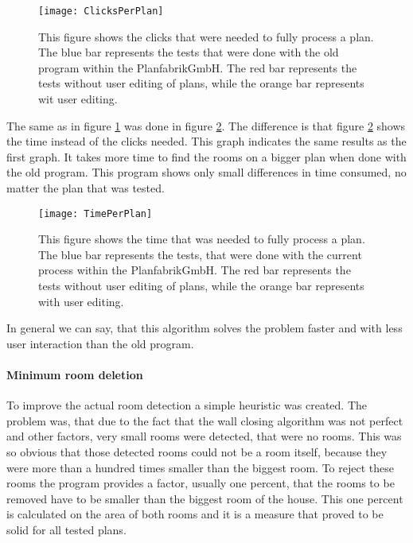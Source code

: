 \begin{figure}[H]
	\centering
	\texttt{[image: ClicksPerPlan]}
	\caption{This figure shows the clicks that were needed to fully process a plan. The blue bar represents the tests that were done with the old program within the PlanfabrikGmbH. The red bar represents the tests without user editing of plans, while the orange bar represents wit user editing.}
	\label{fig:ClicksPerPlan}
\end{figure}

The same as in figure \ref{fig:ClicksPerPlan} was done in figure \ref{fig:TimePerPlan}. The difference is that figure \ref{fig:TimePerPlan} shows the time instead of the clicks needed. This graph indicates the same results as the first graph. It takes more time to find the rooms on a bigger plan when done with the old program. This program shows only small differences in time consumed, no matter the plan that was tested. 

\begin{figure}[H]
	\centering
	\texttt{[image: TimePerPlan]}
	\caption{This figure shows the time that was needed to fully process a plan. The blue bar represents the tests, that were done with the current process within the PlanfabrikGmbH. The red bar represents the tests without user editing of plans, while the orange bar represents with user editing.}
	\label{fig:TimePerPlan}
\end{figure}

In general we can say, that this algorithm solves the problem faster and with less user interaction than the old program.

\paragraph{Minimum room deletion}
To improve the actual room detection a simple heuristic was created. The problem was, that due to the fact that the wall closing algorithm was not perfect and other factors, very small rooms were detected, that were no rooms. This was so obvious that those detected rooms could not be a room itself, because they were more than a hundred times smaller than the biggest room.
To reject these rooms the program provides a factor, usually one percent, that the rooms to be removed have to be smaller than the biggest room of the house. This one percent is calculated on the area of both rooms and it is a measure that proved to be solid for all tested plans.


